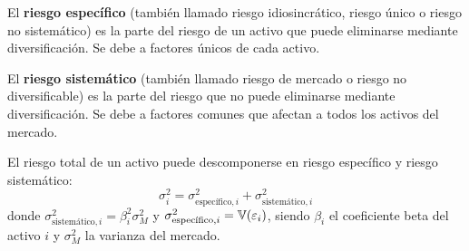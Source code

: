\begin{definicion}
El \textbf{riesgo específico} (también llamado riesgo idiosincrático, riesgo único o riesgo no sistemático) es la parte del riesgo de un activo que puede eliminarse mediante diversificación. Se debe a factores únicos de cada activo.
\end{definicion}

\begin{definicion}
El \textbf{riesgo sistemático} (también llamado riesgo de mercado o riesgo no diversificable) es la parte del riesgo que no puede eliminarse mediante diversificación. Se debe a factores comunes que afectan a todos los activos del mercado.
\end{definicion}

\begin{teorema}
El riesgo total de un activo puede descomponerse en riesgo específico y riesgo sistemático:
\begin{equation}
\sigma_i^2 = \sigma_{\text{específico},i}^2 + \sigma_{\text{sistemático},i}^2
\end{equation}
donde $\sigma_{\text{sistemático},i}^2 = \beta_i^2 \sigma_M^2$ y $\sigma_{\text{específico},i}^2 = \mathbb{V}(\varepsilon_i)$, siendo $\beta_i$ el coeficiente beta del activo $i$ y $\sigma_M^2$ la varianza del mercado.
\end{teorema}

